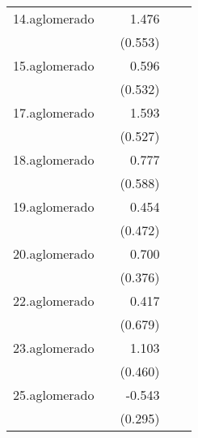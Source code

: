 {\begin{longtable}{l*{4}{D{.}{.}{-1}}}
\addlinespace
14.aglomerado&                     &       1.476\sym{**} &                     &                     \\
            &                     &     (0.553)         &                     &                     \\
\addlinespace
15.aglomerado&                     &       0.596         &                     &                     \\
            &                     &     (0.532)         &                     &                     \\
\addlinespace
17.aglomerado&                     &       1.593\sym{**} &                     &                     \\
            &                     &     (0.527)         &                     &                     \\
\addlinespace
18.aglomerado&                     &       0.777         &                     &                     \\
            &                     &     (0.588)         &                     &                     \\
\addlinespace
19.aglomerado&                     &       0.454         &                     &                     \\
            &                     &     (0.472)         &                     &                     \\
\addlinespace
20.aglomerado&                     &       0.700         &                     &                     \\
            &                     &     (0.376)         &                     &                     \\
\addlinespace
22.aglomerado&                     &       0.417         &                     &                     \\
            &                     &     (0.679)         &                     &                     \\
\addlinespace
23.aglomerado&                     &       1.103\sym{*}  &                     &                     \\
            &                     &     (0.460)         &                     &                     \\
\addlinespace
25.aglomerado&                     &      -0.543         &                     &                     \\
            &                     &     (0.295)         &                     &                     \\

\end{longtable}}
